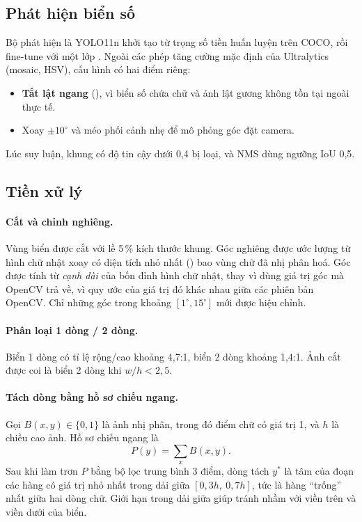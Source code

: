 \subsection{Phát hiện biển số}
Bộ phát hiện là YOLO11n khởi tạo từ trọng số tiền huấn luyện trên COCO, rồi fine-tune với một lớp . Ngoài các phép tăng cường mặc định của Ultralytics (mosaic, HSV), cấu hình có hai điểm riêng:
\begin{itemize}[nosep]
  \item \textbf{Tắt lật ngang} (), vì biển số chứa chữ và ảnh lật gương không tồn tại ngoài thực tế.
  \item Xoay $\pm 10^\circ$ và méo phối cảnh nhẹ để mô phỏng góc đặt camera.
\end{itemize}
Lúc suy luận, khung có độ tin cậy dưới 0,4 bị loại, và NMS dùng ngưỡng IoU 0,5.

\subsection{Tiền xử lý}
\paragraph{Cắt và chỉnh nghiêng.} Vùng biển được cắt với lề 5\,\% kích thước khung. Góc nghiêng được ước lượng từ hình chữ nhật xoay có diện tích nhỏ nhất () bao vùng chữ đã nhị phân hoá. Góc được tính từ \emph{cạnh dài} của bốn đỉnh hình chữ nhật, thay vì dùng giá trị góc mà OpenCV trả về, vì quy ước của giá trị đó khác nhau giữa các phiên bản OpenCV. Chỉ những góc trong khoảng $[1^\circ, 15^\circ]$ mới được hiệu chỉnh.

\paragraph{Phân loại 1 dòng / 2 dòng.} Biển 1 dòng có tỉ lệ rộng/cao khoảng 4,7:1, biển 2 dòng khoảng 1,4:1. Ảnh cắt được coi là biển 2 dòng khi $w/h < 2{,}5$.

\paragraph{Tách dòng bằng hồ sơ chiếu ngang.}\label{sec:split}
Gọi $B(x,y) \in \{0,1\}$ là ảnh nhị phân, trong đó điểm chữ có giá trị 1, và $h$ là chiều cao ảnh. Hồ sơ chiếu ngang là
\begin{equation}
  P(y) = \sum_{x} B(x,y).
\end{equation}
Sau khi làm trơn $P$ bằng bộ lọc trung bình 3 điểm, dòng tách $y^\ast$ là tâm của đoạn các hàng có giá trị nhỏ nhất trong dải giữa $[0{,}3h,\ 0{,}7h]$, tức là hàng ``trống'' nhất giữa hai dòng chữ. Giới hạn trong dải giữa giúp tránh nhầm với viền trên và viền dưới của biển.

